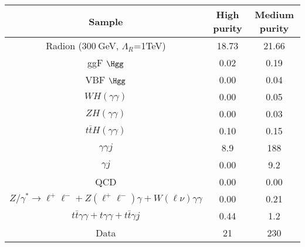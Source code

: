 \begin{tabular}{|c|c|c|}
\hline
Sample & High purity & Medium purity\\
\hline
Radion (300$~$GeV, $\Lambda_R$=1TeV)  & 18.73 & 21.66     \\
\hline
ggF $\Hgg$                &  0.02  &  0.19 \\
VBF $\Hgg$                &  0.00  &  0.04 \\
$WH(\gamma\gamma)$        &  0.00  &  0.05 \\
$ZH(\gamma\gamma)$        &  0.00  &  0.03 \\
$t\bar{t}H(\gamma\gamma)$ &  0.10  &  0.15 \\
\hline
$\gamma\gamma j$                      & 8.9  &  188  \\
$\gamma j$                            & 0.00 &  9.2  \\ 
QCD                                   & 0.00 &  0.00 \\ 
$Z/\gamma^*\rightarrow\ell^+\ell^- + Z(\ell^+\ell^-)\gamma + W(\ell\nu)\gamma\gamma$ & 0.00 &  0.21 \\
$t\bar{t}\gamma\gamma + t\gamma\gamma + t\bar{t}\gamma j$ & 0.44 &  1.2  \\
\hline
Data                                  & 21 & 230 \\
\hline
\end{tabular}
